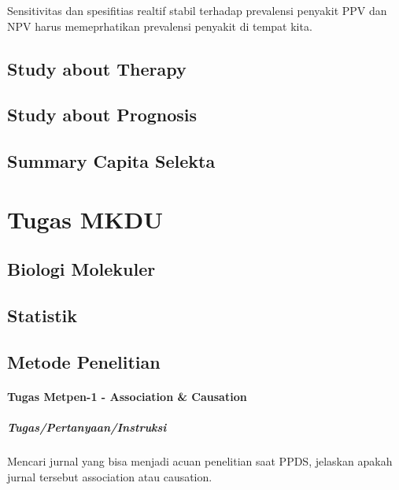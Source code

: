\documentclass[
  letterpaper,
  DIV=11,
  numbers=noendperiod]{scrreprt}
\let\oldparagraph\paragraph
\renewcommand{\paragraph}[1]{\oldparagraph{#1}\mbox{}}
\begin{document}
Sensitivitas dan spesifitias realtif stabil terhadap prevalensi penyakit
PPV dan NPV harus memeprhatikan prevalensi penyakit di tempat kita.

\section{Study about Therapy}\label{study-about-therapy}

\section{Study about Prognosis}\label{study-about-prognosis}

\section{Summary Capita Selekta}\label{summary-capita-selekta}

\chapter{Tugas MKDU}\label{tugas-mkdu}

\section{Biologi Molekuler}\label{biologi-molekuler}

\section{Statistik}\label{statistik}

\section{Metode Penelitian}\label{metode-penelitian}

\subsubsection{Tugas Metpen-1 - Association \&
Causation}\label{tugas-metpen-1---association-causation}

\paragraph{Tugas/Pertanyaan/Instruksi}\label{tugaspertanyaaninstruksi}

Mencari jurnal yang bisa menjadi acuan penelitian saat PPDS, jelaskan
apakah jurnal tersebut association atau causation.
\end{document}
